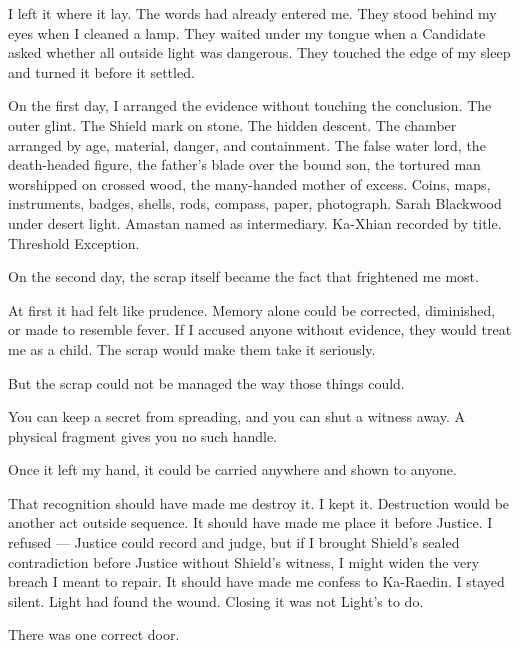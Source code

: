 I left it where it lay. The words had already entered me. They stood behind my eyes when I cleaned a lamp. They waited under my tongue when a Candidate asked whether all outside light was dangerous. They touched the edge of my sleep and turned it before it settled.\par

On the first day, I arranged the evidence without touching the conclusion. The outer glint. The Shield mark on stone. The hidden descent. The chamber arranged by age, material, danger, and containment. The false water lord, the death-headed figure, the father's blade over the bound son, the tortured man worshipped on crossed wood, the many-handed mother of excess. Coins, maps, instruments, badges, shells, rods, compass, paper, photograph. Sarah Blackwood under desert light. Amastan named as intermediary. Ka-Xhian recorded by title. Threshold Exception.\par

On the second day, the scrap itself became the fact that frightened me most.\par

At first it had felt like prudence. Memory alone could be corrected, diminished, or made to resemble fever. If I accused anyone without evidence, they would treat me as a child. The scrap would make them take it seriously.\par

But the scrap could not be managed the way those things could.\par

You can keep a secret from spreading, and you can shut a witness away. A physical fragment gives you no such handle.\par

Once it left my hand, it could be carried anywhere and shown to anyone.\par

That recognition should have made me destroy it. I kept it. Destruction would be another act outside sequence. It should have made me place it before Justice. I refused --- Justice could record and judge, but if I brought Shield's sealed contradiction before Justice without Shield's witness, I might widen the very breach I meant to repair. It should have made me confess to Ka-Raedin. I stayed silent. Light had found the wound. Closing it was not Light's to do.\par

There was one correct door.\par

